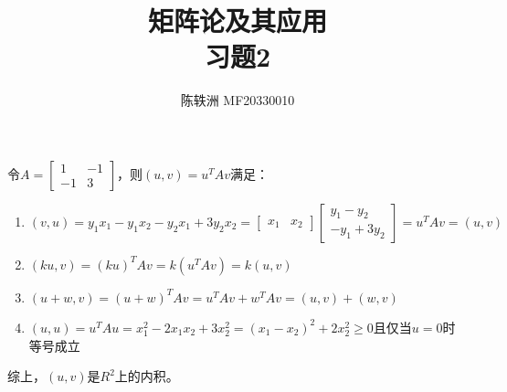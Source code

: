 \documentclass{article}
\title{矩阵论及其应用\\习题2}
\author{陈轶洲 MF20330010}
\begin{document}
	\maketitle

\section{}	
令$ A = \begin{bmatrix}1 & -1 \\ -1 & 3 \end{bmatrix} $，则$ (u,v)=u^TAv $满足：
\begin{enumerate}[1)]
	\item 
	$(v, u)=y_1x_1-y_1x_2-y_2x_1+3y_2x_2=\begin{bmatrix}x_1 & x_2\end{bmatrix}\begin{bmatrix}y_1-y_2\\ -y_1+3y_2 \end{bmatrix}  =u^TAv=(u,v)$
	\item $(ku,v)=(ku)^TAv=k(u^TAv)=k(u,v)$ 
	\item $(u+w,v)=(u+w)^TAv=u^TAv+w^TAv=(u,v)+(w,v)$
	\item $(u,u) = u^TAu=x_1^2-2x_1x_2+3x_2^2=(x_1-x_2)^2+2x_2^2\ge 0$且仅当$ u=0 $时等号成立
\end{enumerate}
综上，$ (u,v) $是$R^2$上的内积。
\end{document}
